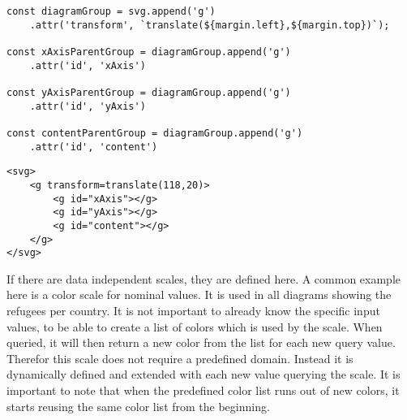 \begin{minipage}{\linewidth}
\begin{lstlisting}[style=htmlcssjs, captionpos=b, caption={JavaScript code to create the hierarchy as used in the bar-chart. The first line adds a new group element to themain SVG container using the \texttt{append} command. The newly added group element is saved in a constant for later references. Furthermore in line two an attribute is added to the new group element using the \texttt{attr} command and method chaining. It moves the group element from the left and top to allign with the margin definition. In each of the lines four, seven and ten, another group element is added. They are added to the previously created group element. They are all stored in constants for later reference and are provided with id's for easier identification and debugging.}, label={lst:hierarchy_creation}]
const diagramGroup = svg.append('g')
    .attr('transform', `translate(${margin.left},${margin.top})`);

const xAxisParentGroup = diagramGroup.append('g')
    .attr('id', 'xAxis')

const yAxisParentGroup = diagramGroup.append('g')
    .attr('id', 'yAxis')

const contentParentGroup = diagramGroup.append('g')
    .attr('id', 'content')
\end{lstlisting}
\begin{lstlisting}[style=htmlcssjs, captionpos=b, caption={The HTML structure which results from the JavaScript code in listing \ref{lst:hierarchy_creation}. The resulting tree structure clearly separates the different aspects of the diagram. Using a hierarchical approach makes not only later selections easier, but also increases human readability and simplyfies debugging.}, label={lst:hierarchy_result}]
<svg>
    <g transform=translate(118,20)>
        <g id="xAxis"></g>
        <g id="yAxis"></g>
        <g id="content"></g>
    </g>
</svg>
    \end{lstlisting}
\end{minipage}


If there are data independent scales, they are defined here. A common example here is a color scale for nominal values. It is used in all diagrams showing the refugees per country. It is not important to already know the specific input values, to be able to create a list of colors which is used by the scale. When queried, it will then return a new color from the list for each new query value. Therefor this scale does not require a predefined domain. Instead it is dynamically defined and extended with each new value querying the scale. It is important to note that when the predefined color list runs out of new colors, it starts reusing the same color list from the beginning.

